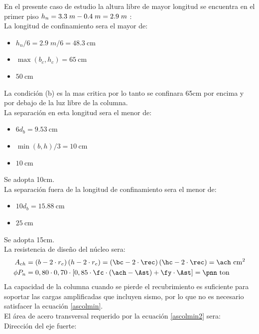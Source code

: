 \noindent En el presente caso de estudio la altura libre de mayor longitud se encuentra en el primer piso $h_{n}=3.3\;m-0.4\;m=\fpeval{3.3-0.4}\;m$
:\\
La longitud de confinamiento sera el mayor de:
\begin{itemize}
\item $h_{n} / 6= 2.9\;m/6 = 48.3\mathrm{~cm}$
\item $\max (b_{c},h_{c})= 65\mathrm{~cm}$
\item $50 \mathrm{~cm}$
\end{itemize}
La condición (b) es la mas critica por lo tanto se confinara 65cm por encima y por debajo de la luz libre de la columna.\\
La separación en esta longitud sera el menor de:
 \begin{itemize} 
\item $6d_{b}=9.53 \mathrm{~cm}$
\item $\min (b,h)/ 3=10 \mathrm{~cm}$
\item $10 \mathrm{~cm}$
    \end{itemize} 
Se adopta 10cm.\\
La separación fuera de la longitud de confinamiento sera el menor de:
 \begin{itemize} 
\item $10d_{b}=15.88 \mathrm{~cm}$
\item $25 \mathrm{~cm}$
    \end{itemize}
Se adopta 15cm.\\
La resistencia de diseño del núcleo sera:
\begin{align*}
    A_{ch}&=\left ( b-2\cdot r_{e} \right )\left ( h-2\cdot r_{e} \right )= \left ( \bc-2\cdot \rec \right )\left ( \hc-2\cdot \rec \right )=\ach \mathrm{~cm^2}\\
    \phi P_{n}&=0,80 \cdot 0,70 \cdot\left[0,85 \cdot \fc \cdot\left(\ach-\Ast\right)+\fy \cdot \Ast\right]=\pnn \mathrm{~ton}
\end{align*}
La capacidad de la columna cuando se pierde el recubrimiento es suficiente para soportar las cargas amplificadas que incluyen sismo, por lo que no es necesario satisfacer la ecuación \ref{ascolmin}.\\
El área de acero transversal requerido por la ecuación \ref{ascolmin2} sera:\\
Dirección del eje fuerte:
